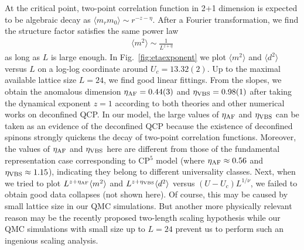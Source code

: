 \documentclass[twocolumn,superscriptaddress]{revtex4-1}
\begin{document}
At the critical point, two-point correlation function in 2+1 dimension is expected to be algebraic decay as $\langle m_rm_0\rangle\sim r^{-z-\eta}$. \cite{Sondhi1997} After a Fourier transformation, we find the structure factor satisfies the same power law
\begin{eqnarray}
  \langle m^2 \rangle \sim \frac{1}{L^{z+\eta}}
\end{eqnarray}
as long as $L$ is large enough.
In Fig.~\ref{fig:etaexponent} we plot $\langle m^2 \rangle$ and $\langle d^2\rangle$ versus $L$ on a log-log coordinate around $U_c=13.32(2)$. Up to the maximal available lattice size $L=24$, we find good linear fittings. From the slopes, we obtain the anomalous dimension $\eta_{\rm AF}=0.44(3)$ and $\eta_{\rm VBS}=0.98(1)$ after taking the dynamical exponent $z=1$ according to both theories and other numerical works on deconfined QCP. \cite{Senthil2004,*Senthil2004a,*Levin2004,Sandvik2007} 
In our model, the large values of $\eta_{\rm AF}$ and $\eta_{\rm VBS}$ can be taken as an evidence of the deconfined QCP because the existence of deconfined spinons strongly quickens the decay of two-point correlation functions. Moreover, the values of $\eta_{\rm AF}$ and $\eta_{\rm VBS}$ here are different from those of the fundamental representation case corresponding to CP$^{5}$ model (where $\eta_{\rm AF}\approx0.56$ and $\eta_{\rm VBS}\approx1.15$), \cite{Kaul2012a} indicating they belong to different universality classes.
Next, when we tried to plot $L^{z+\eta_{\rm AF}}\langle m^2 \rangle$ and $L^{z+\eta_{\rm VBS}}\langle d^2 \rangle$ versus $(U-U_c)L^{1/\nu}$, we failed to obtain good data collapses (not shown here). Of course, this may be caused by small lattice size in our QMC simulations. But another more physically relevant reason may be the recently proposed two-length scaling hypothesis \cite{Senthil2004,Shao2016} while our QMC simulations with small size up to $L=24$ prevent us to perform such an ingenious scaling analysis.



\end{document}
